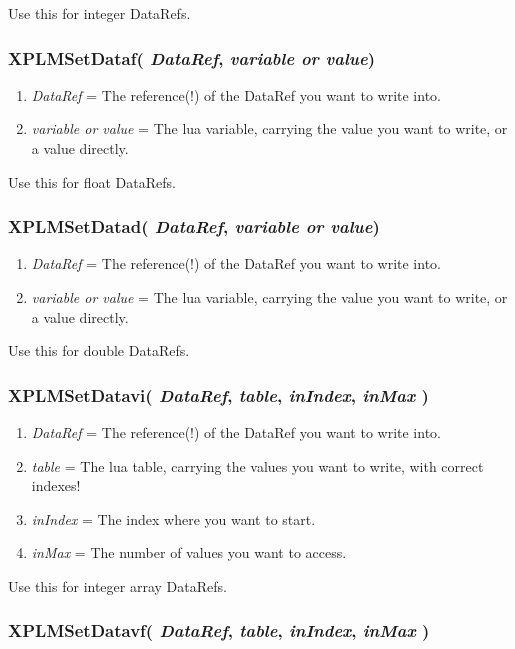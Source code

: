 \documentclass[11pt,parskip=half,a4paper]{scrartcl}
\begin{document}
Use this for integer DataRefs.

\subsubsection{XPLMSetDataf( \emph{DataRef}, \emph{variable or value})}

\begin{enumerate}
	\item \emph{DataRef} = The reference(!) of the DataRef you want to write into.
	\item \emph{variable or value} = The lua variable, carrying the value you want to write, or a value directly.
\end{enumerate}

Use this for float DataRefs.

\subsubsection{XPLMSetDatad( \emph{DataRef}, \emph{variable or value})}

\begin{enumerate}
	\item \emph{DataRef} = The reference(!) of the DataRef you want to write into.
	\item \emph{variable or value} = The lua variable, carrying the value you want to write, or a value directly.
\end{enumerate}

Use this for double DataRefs.

\subsubsection{XPLMSetDatavi( \emph{DataRef}, \emph{table}, \emph{inIndex}, \emph{inMax} )}

\begin{enumerate}
	\item \emph{DataRef} = The reference(!) of the DataRef you want to write into.
	\item \emph{table} = The lua table, carrying the values you want to write, with correct indexes!
	\item \emph{inIndex} = The index where you want to start.
	\item \emph{inMax} = The number of values you want to access.
\end{enumerate}

Use this for integer array DataRefs.

\subsubsection{XPLMSetDatavf( \emph{DataRef}, \emph{table}, \emph{inIndex}, \emph{inMax} )}
\end{document}
